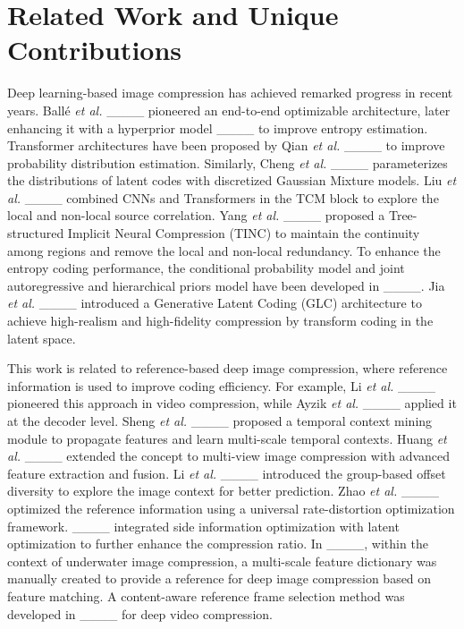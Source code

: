 \section{Related Work and Unique Contributions}
\label{sec:related_work}
Deep learning-based image compression has achieved remarked progress in recent years. Ballé \textit{et al.} ____ pioneered an end-to-end optimizable architecture, later enhancing it with a hyperprior model ____ to improve entropy estimation. Transformer architectures have been proposed by Qian \textit{et al.} ____ to improve probability distribution estimation. Similarly, Cheng \textit{et al.} ____ parameterizes the distributions of latent codes with discretized Gaussian Mixture models. Liu \textit{et al.} ____ combined CNNs and Transformers in the TCM block to explore the local and non-local source correlation. Yang \textit{et al.} ____ proposed a Tree-structured Implicit Neural Compression (TINC) to maintain the continuity among regions and remove the local and non-local redundancy. To enhance the entropy coding performance, the conditional probability model and joint autoregressive and hierarchical priors model have been developed in ____. Jia \textit{et al.} ____ introduced a Generative Latent Coding (GLC) architecture to achieve high-realism and high-fidelity compression by transform coding in the latent space. 

This work is related to reference-based deep image compression, where reference information is used to improve coding efficiency. For example, Li \textit{et al.} ____ pioneered this approach in video compression, while Ayzik \textit{et al.} ____ applied it at the decoder level. Sheng \textit{et al.} ____ proposed a temporal context mining module to propagate features and learn multi-scale temporal contexts. Huang \textit{\textit{et al.}} ____ extended the concept to multi-view image compression with advanced feature extraction and fusion. Li \textit{et al.} ____ introduced the group-based offset diversity to explore the image context for better prediction. Zhao \textit{et al.} ____ optimized the reference information using a universal rate-distortion optimization framework. ____ integrated side information optimization with latent optimization to further enhance the compression ratio. In ____, within the context of underwater image compression, a multi-scale feature dictionary was manually created to provide a reference for deep image compression based on feature matching. A content-aware reference frame selection method was developed in ____ for deep video compression. 

